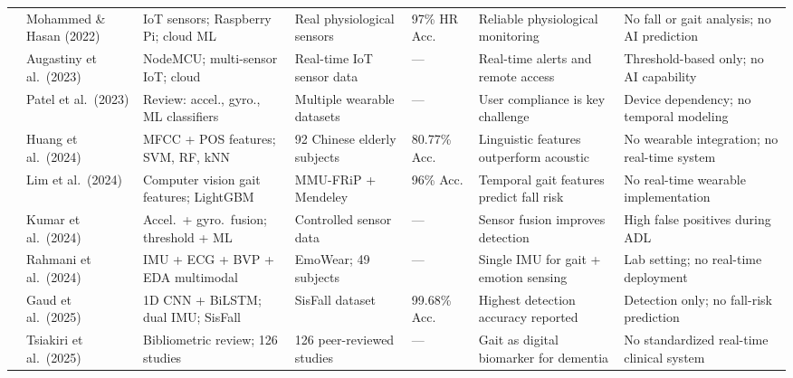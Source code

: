 \documentclass[conference]{IEEEtran}
\begin{document}
\begin{table}[!t]
\begin{tabular}{C{0.55cm} L{1.6cm} L{2.2cm} L{1.8cm} C{1.0cm} L{2.5cm} L{2.5cm}}
\cite{mohammed2022}     & Mohammed \& Hasan (2022)    & IoT sensors; Raspberry Pi; cloud ML                   & Real physiological sensors    & 97\% HR Acc.      & Reliable physiological monitoring                  & No fall or gait analysis; no AI prediction             \\
\cite{augastiny2023}    & Augastiny et al.\ (2023)    & NodeMCU; multi-sensor IoT; cloud                      & Real-time IoT sensor data     & ---               & Real-time alerts and remote access                 & Threshold-based only; no AI capability                 \\
\cite{patel2023}        & Patel et al.\ (2023)        & Review: accel., gyro., ML classifiers                 & Multiple wearable datasets    & ---               & User compliance is key challenge                   & Device dependency; no temporal modeling                \\
\cite{huang2024}        & Huang et al.\ (2024)        & MFCC + POS features; SVM, RF, kNN                     & 92 Chinese elderly subjects   & 80.77\% Acc.      & Linguistic features outperform acoustic            & No wearable integration; no real-time system           \\
\cite{lim2024}          & Lim et al.\ (2024)          & Computer vision gait features; LightGBM               & MMU-FRiP + Mendeley           & 96\% Acc.         & Temporal gait features predict fall risk           & No real-time wearable implementation                   \\
\cite{kumar2024}        & Kumar et al.\ (2024)        & Accel.\ + gyro.\ fusion; threshold + ML               & Controlled sensor data        & ---               & Sensor fusion improves detection                   & High false positives during ADL                        \\
\cite{rahmani2024}      & Rahmani et al.\ (2024)      & IMU + ECG + BVP + EDA multimodal                      & EmoWear; 49 subjects          & ---               & Single IMU for gait + emotion sensing              & Lab setting; no real-time deployment                   \\
\cite{gaud2025}         & Gaud et al.\ (2025)         & 1D CNN + BiLSTM; dual IMU; SisFall                    & SisFall dataset               & 99.68\% Acc.      & Highest detection accuracy reported                & Detection only; no fall-risk prediction                \\
\cite{tsiakiri2025}     & Tsiakiri et al.\ (2025)     & Bibliometric review; 126 studies                      & 126 peer-reviewed studies     & ---               & Gait as digital biomarker for dementia             & No standardized real-time clinical system              \\

\end{tabular}
\end{table}
\end{document}
